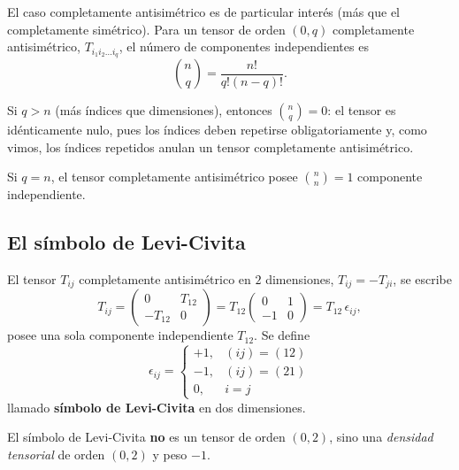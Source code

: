 El caso completamente antisimétrico es de particular interés (más que el
completamente simétrico). Para un tensor de orden $(0,q)$ completamente
antisimétrico, $T_{i_1i_2\dots i_q}$, el número de componentes
independientes es
\[
\binom{n}{q} = \frac{n!}{q!(n-q)!} .
\]

\begin{observacion}
Si $q>n$ (más índices que dimensiones), entonces $\binom{n}{q}=0$: el
tensor es idénticamente nulo, pues los índices deben repetirse
obligatoriamente y, como vimos, los índices repetidos anulan un tensor
completamente antisimétrico.
\end{observacion}

Si $q=n$, el tensor completamente antisimétrico posee $\binom{n}{n}=1$
componente independiente.

\subsection{El símbolo de Levi-Civita}

\begin{ejemplo}[Caso $n=2$]
El tensor $T_{ij}$ completamente antisimétrico en $2$ dimensiones,
$T_{ij}=-T_{ji}$, se escribe
\[
T_{ij} = \begin{pmatrix} 0 & T_{12} \\ -T_{12} & 0 \end{pmatrix} =
T_{12} \begin{pmatrix} 0 & 1 \\ -1 & 0 \end{pmatrix} = T_{12}\,
\epsilon_{ij},
\]
posee una sola componente independiente $T_{12}$. Se define
\[
\epsilon_{ij} = \begin{cases} +1, & (ij)=(12) \\ -1, & (ij)=(21) \\ 0, &
i=j \end{cases}
\]
llamado \textbf{símbolo de Levi-Civita} en dos dimensiones.
\end{ejemplo}

\begin{observacion}
El símbolo de Levi-Civita \textbf{no} es un tensor de orden $(0,2)$, sino
una \emph{densidad tensorial} de orden $(0,2)$ y peso $-1$.
\end{observacion}

